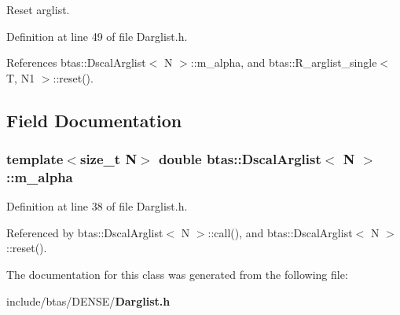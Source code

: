 Reset arglist. 



Definition at line 49 of file Darglist.\-h.



References btas\-::\-Dscal\-Arglist$<$ N $>$\-::m\-\_\-alpha, and btas\-::\-R\-\_\-arglist\-\_\-single$<$ T, N1 $>$\-::reset().



\subsection{Field Documentation}
\subsubsection[{m\-\_\-alpha}]{\setlength{\rightskip}{0pt plus 5cm}template$<$size\-\_\-t N$>$ double {\bf btas\-::\-Dscal\-Arglist}$<$ N $>$\-::m\-\_\-alpha\hspace{0.3cm}{\ttfamily [private]}}\label{d0/d2f/classbtas_1_1DscalArglist_af03624d1ff60170efb19b8d6c9d8e26e}


Definition at line 38 of file Darglist.\-h.



Referenced by btas\-::\-Dscal\-Arglist$<$ N $>$\-::call(), and btas\-::\-Dscal\-Arglist$<$ N $>$\-::reset().



The documentation for this class was generated from the following file\-:\begin{DoxyCompactItemize}
\item 
include/btas/\-D\-E\-N\-S\-E/{\bf Darglist.\-h}\end{DoxyCompactItemize}
